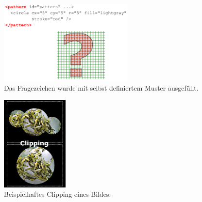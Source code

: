 \begin{figure}[h]\centering
\includegraphics[width=0.6\textwidth]{pictures/pattern.png}
\caption{Das Fragezeichen wurde mit selbst definiertem Muster ausgefüllt.}
\label{fig:pattern}
\end{figure}
\begin{figure}[h]\centering
\includegraphics[width=0.3\textwidth]{pictures/kap14_1.jpg}
\caption{Beispielhaftes Clipping eines Bildes.}
\label{fig:clip}
\end{figure}

\newpage
